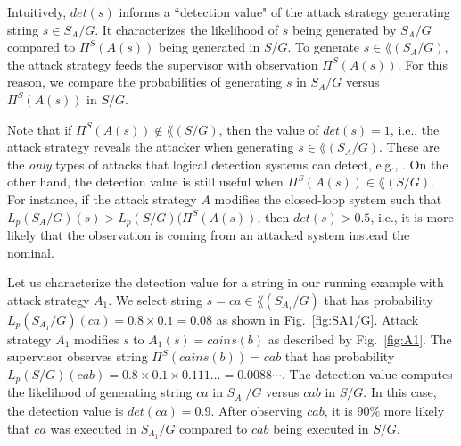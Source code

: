 Intuitively, $det(s)$ informs a ``detection value" of the attack strategy generating string $s\in S_A/G$.
It characterizes the likelihood of $s$ being generated by $S_A/G$ compared to $\Pi^S(A(s))$ being generated in $S/G$.
To generate $s \in \lang(S_A/G)$, the attack strategy feeds the supervisor with observation $\Pi^S(A(s))$.
For this reason, we compare the probabilities of generating $s$ in $S_A/G$ versus $\Pi^S(A(s))$ in $S/G$.


Note that if $\Pi^S(A(s))\notin \lang(S/G)$, then the value of $det(s) = 1$, i.e., the attack strategy reveals the attacker when generating $s\in\lang(S_A/G)$.
These are the \emph{only} types of attacks that logical detection systems can detect, e.g., \citep{Carvalho:2018, Lima:2019, lin2024diagnosability}.
On the other hand, the detection value is still useful when $\Pi^S(A(s))\in \lang(S/G)$.
For instance, if the attack strategy $A$ modifies the closed-loop system such that $L_p(S_A/G)(s)>L_p(S/G)(\Pi^S(A(s))$, then $det(s)>0.5$, i.e., it is more likely that the observation is coming from an attacked system instead the nominal.

\begin{example}
Let us characterize the detection value for a string in our running example with attack strategy $A_1$.
We select string $s = ca\in \lang(S_{A_1}/G)$ that has probability $L_p(S_{A_1}/G)(ca) = 0.8\times 0.1 = 0.08$ as shown in Fig.~\ref{fig:SA1/G}.
Attack strategy $A_1$ modifies $s$ to $A_1(s) = cains(b)$ as described by Fig.~\ref{fig:A1}.
The supervisor observes string $\Pi^S(cains(b)) = cab$ that has probability $L_p(S/G)(cab) = 0.8\times 0.1 \times 0.111\dots = 0.0088\cdots$.
The detection value computes the likelihood of generating string $ca$ in $S_{A_1}/G$ versus $cab$ in $S/G$.
In this case, the detection value is $det(ca) = 0.9$.
After observing $cab$, it is $90\%$ more likely that $ca$ was executed in $S_{A_1}/G$ compared to $cab$ being executed in $S/G$.
\end{example}




